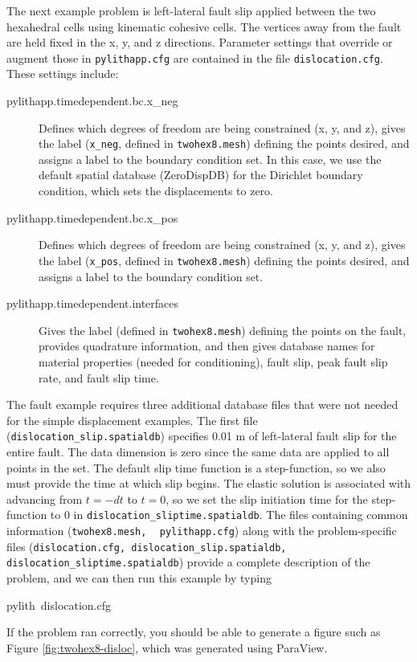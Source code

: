 The next example problem is left-lateral fault slip applied between
the two hexahedral cells using kinematic cohesive cells. The vertices
away from the fault are held fixed in the x, y, and z directions.
Parameter settings that override or augment those in \texttt{pylithapp.cfg}
are contained in the file \texttt{dislocation.cfg}. These settings
include:
\begin{description}
\item [{pylithapp.timedependent.bc.x\_neg}] Defines which degrees of freedom
are being constrained (x, y, and z), gives the label (\texttt{x\_neg},
defined in \texttt{twohex8.mesh}) defining the points desired, and
assigns a label to the boundary condition set. In this case, we use
the default spatial database (ZeroDispDB) for the Dirichlet boundary
condition, which sets the displacements to zero.
\item [{pylithapp.timedependent.bc.x\_pos}] Defines which degrees of freedom
are being constrained (x, y, and z), gives the label (\texttt{x\_pos},
defined in \texttt{twohex8.mesh}) defining the points desired, and
assigns a label to the boundary condition set.
\item [{pylithapp.timedependent.interfaces}] Gives the label (defined in
\texttt{twohex8.mesh}) defining the points on the fault, provides
quadrature information, and then gives database names for material
properties (needed for conditioning), fault slip, peak fault slip
rate, and fault slip time.
\end{description}
The fault example requires three additional database files that were
not needed for the simple displacement examples. The first file (\texttt{dislocation\_slip.spatialdb})
specifies 0.01 m of left-lateral fault slip for the entire fault.
The data dimension is zero since the same data are applied to all
points in the set. The default slip time function is a step-function,
so we also must provide the time at which slip begins. The elastic
solution is associated with advancing from $t=-dt$ to $t=0$, so
we set the slip initiation time for the step-function to 0 in \texttt{dislocation\_sliptime.spatialdb}.
The files containing common information (\texttt{twohex8.mesh,}{\small{}
}\texttt{\small{}}~\linebreak{}
\texttt{pylithapp.cfg}) along with the problem-specific files (\texttt{dislocation.cfg,
dislocation\_slip.spatialdb, dislocation\_sliptime.spatialdb}) provide
a complete description of the problem, and we can then run this example
by typing
\begin{lyxcode}
pylith~dislocation.cfg
\end{lyxcode}
If the problem ran correctly, you should be able to generate a figure
such as Figure \vref{fig:twohex8-disloc}, which was generated using
ParaView.

